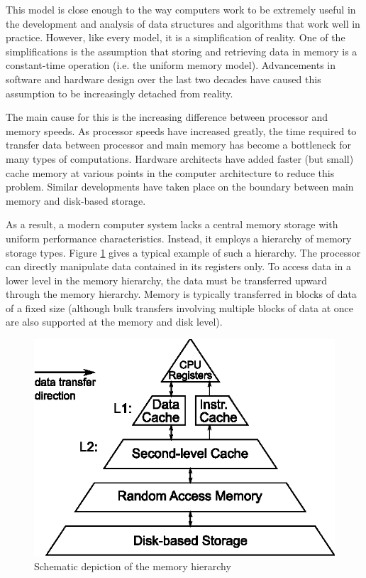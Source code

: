 \documentclass{acm_proc_article-sp}
\begin{document}
This model is close enough to the way computers work to be extremely useful in the development and analysis of data structures and algorithms that work well in practice. However, like every model, it is a simplification of reality. One of the simplifications is the assumption that storing and retrieving data in memory is a constant-time operation (i.e. the uniform memory model). Advancements in software and hardware design over the last two de\-cades have caused this assumption to be increasingly detached from reality.

The main cause for this is the increasing difference between processor and memory speeds. As processor speeds have increased greatly, the time required to transfer data between processor and main memory has become a bottleneck for many types of computations. Hardware architects have added faster (but small) cache memory at various points in the computer architecture to reduce this problem.
Similar developments have taken place on the boundary between main memory and disk-based storage.

As a result, a modern computer system lacks a central memory storage with uniform performance characteristics. Instead, it employs a hierarchy of memory storage types. Figure \ref{fig-memhier} gives a typical example of such a hierarchy. The processor can directly manipulate data contained in its registers only. To access data in a lower level in the memory hierarchy, the data must be transferred upward through the memory hierarchy. Memory is typically transferred in blocks of data of a fixed size (although bulk transfers involving multiple blocks of data at once are also supported at the memory and disk level).

\begin{figure}
\centering
\includegraphics{memhier}
\caption{Schematic depiction of the memory hierarchy}\label{fig-memhier}
\end{figure}
\end{document}
